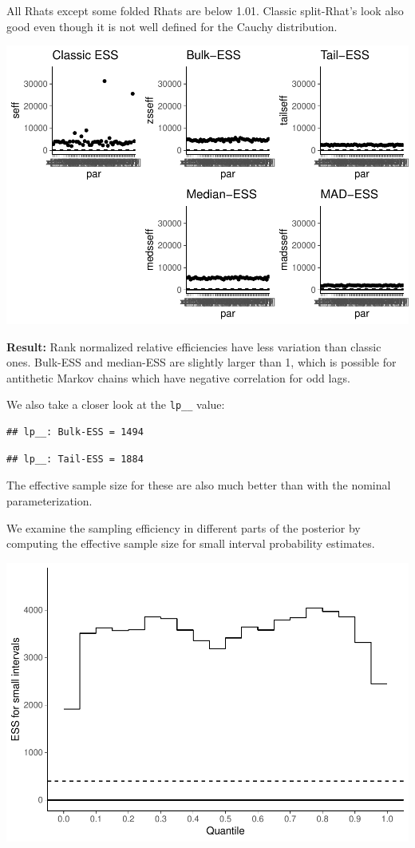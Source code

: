 \documentclass[american,]{article}
\begin{document}
All Rhats except some folded Rhats are below 1.01. Classic split-Rhat's
look also good even though it is not well defined for the Cauchy
distribution.

\includegraphics{graphics/ess-fit-alt3-1.pdf}

\textbf{Result:} Rank normalized relative efficiencies have less
variation than classic ones. Bulk-ESS and median-ESS are slightly larger
than 1, which is possible for antithetic Markov chains which have
negative correlation for odd lags.

We also take a closer look at the \texttt{lp\_\_} value:

\begin{verbatim}
## lp__: Bulk-ESS = 1494
\end{verbatim}

\begin{verbatim}
## lp__: Tail-ESS = 1884
\end{verbatim}

The effective sample size for these are also much better than with the
nominal parameterization.

We examine the sampling efficiency in different parts of the posterior
by computing the effective sample size for small interval probability
estimates.

\includegraphics{graphics/local-ess-fit-alt3-1.pdf}
\end{document}
